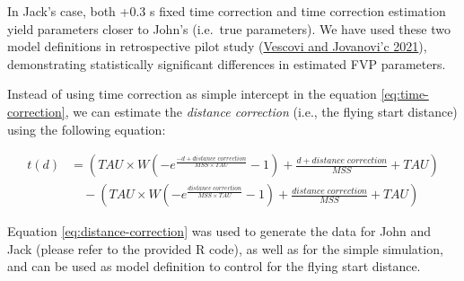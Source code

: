 \documentclass[fleqn,10pt]{wlpeerj} %
\begin{document}
\begin{table}[!h]
\centering
{}
\end{table}

\normalsize

In Jack's case, both +0.3 s fixed time correction and time correction estimation yield parameters closer to John's (i.e.~true parameters). We have used these two model definitions in retrospective pilot study (\protect\hyperlink{ref-vescoviSprintMechanicalCharacteristics2021}{Vescovi and Jovanovi'c 2021}), demonstrating statistically significant differences in estimated FVP parameters.

Instead of using time correction as simple intercept in the equation \eqref{eq:time-correction}, we can estimate the \emph{distance correction} (i.e., the flying start distance) using the following equation:

\begin{equation}
  \begin{split}
   t(d) &= (TAU \times W(-e^{\frac{-d + distance \; correction}{MSS \times TAU}} - 1) + \frac{d + distance \; correction}{MSS} + TAU) \\ 
   &\quad-(TAU \times W(-e^{\frac{distance \; correction}{MSS \times TAU}} - 1) + \frac{distance \; correction}{MSS} + TAU) 
   \end{split}
   \label{eq:distance-correction}
\end{equation}

Equation \eqref{eq:distance-correction} was used to generate the data for John and Jack (please refer to the provided R code), as well as for the simple simulation, and can be used as model definition to control for the flying start distance.
\end{document}
